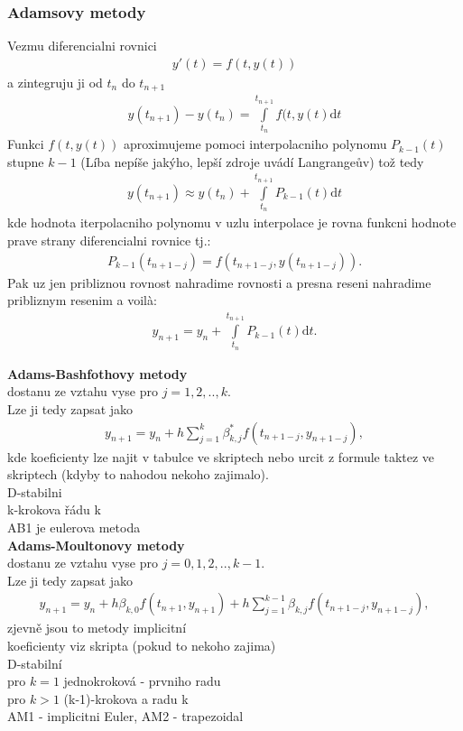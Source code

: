\subsubsection*{Adamsovy metody}

Vezmu diferencialni rovnici
\begin{align}
y'(t)= f(t,y(t))
\end{align}
a zintegruju ji od $t_{n}$ do $t_{n+1}$
\begin{align*}
y(t_{n+1})-y(t_{n}) = \int \limits_{t_{n}}^{t_{n+1}} f(t,y(t) \mathrm{d}t
\end{align*}
Funkci $f(t,y(t))$ aproximujeme pomoci interpolacniho polynomu $P_{k-1}(t)$ stupne $k-1$ (Líba nepíše jakýho, lepší zdroje uvádí Langrangeův) tož tedy
\begin{align}
y(t_{n+1}) \approx y(t_{n}) + \int \limits _{t_{n}}^{t_{n+1}} P_{k-1}(t) \mathrm{d}t
\end{align}
kde hodnota iterpolacniho polynomu v uzlu interpolace je rovna funkcni hodnote prave strany diferencialni rovnice tj.:
\begin{align}
P_{k-1}(t_{n+1-j}) = f(t_{n+1-j},y(t_{n+1-j})).
\end{align}
Pak uz jen pribliznou rovnost nahradime rovnosti a presna reseni nahradime pribliznym resenim a voilà:
\begin{align}
y_{n+1}=y_{n}+ \int \limits _{t_{n}}^{t_{n+1}} P_{k-1}(t) \mathrm{d}t.
\end{align}

\textbf{Adams-Bashfothovy metody}
\\ dostanu ze vztahu vyse pro $j=1,2,..,k$. \\
Lze ji tedy zapsat jako \begin{align}
 y_{n+1}=y_{n} + h \sum _{j=1}^{k} \beta^{*}_{k,j} f(t_{n+1-j}, y_{n+1-j}),
\end{align}
kde koeficienty lze najit v tabulce ve skriptech nebo urcit z formule taktez ve skriptech (kdyby to nahodou nekoho zajimalo). 
 \\
D-stabilni \\
k-krokova  řádu k\\
AB1 je eulerova metoda \\

\textbf{Adams-Moultonovy metody}\\
dostanu ze vztahu vyse pro $j=0,1,2,..,k-1$. \\
Lze ji tedy zapsat jako \begin{align}
 y_{n+1}=y_{n} +h \beta_{k,0} f(t_{n+1},y_{n+1})+ h \sum _{j=1}^{k-1} \beta_{k,j} f(t_{n+1-j}, y_{n+1-j}),
\end{align}
zjevně jsou to metody implicitní \\
koeficienty viz skripta (pokud to nekoho zajima) \\
D-stabilní \\
pro $k=1$ jednokroková - prvniho radu \\
pro $k > 1$ (k-1)-krokova a radu k\\
AM1 - implicitni Euler, AM2 - trapezoidal

